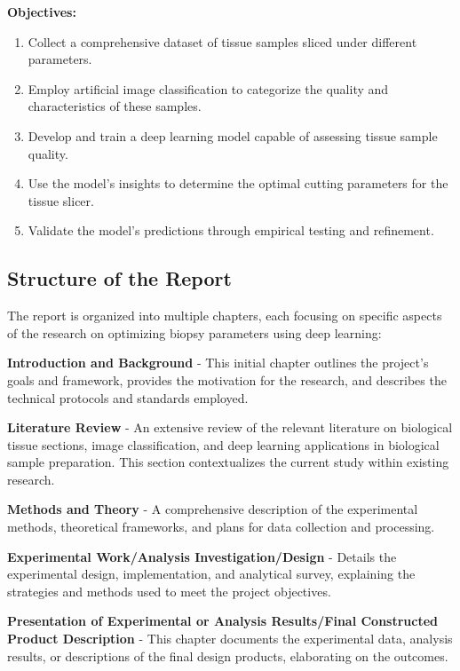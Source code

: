 \textbf{Objectives:}

\begin{enumerate}
    \item Collect a comprehensive dataset of tissue samples sliced under different parameters.
    \item Employ artificial image classification to categorize the quality and characteristics of these samples.
    \item Develop and train a deep learning model capable of assessing tissue sample quality.
    \item Use the model's insights to determine the optimal cutting parameters for the tissue slicer.
    \item Validate the model's predictions through empirical testing and refinement.
\end{enumerate}


\subsection{Structure of the Report}

The report is organized into multiple chapters, each focusing on specific aspects of the research on optimizing biopsy parameters using deep learning:

\textbf{Introduction and Background} - This initial chapter outlines the project's goals and framework, provides the motivation for the research, and describes the technical protocols and standards employed.

\textbf{Literature Review} - An extensive review of the relevant literature on biological tissue sections, image classification, and deep learning applications in biological sample preparation. This section contextualizes the current study within existing research.

\textbf{Methods and Theory} - A comprehensive description of the experimental methods, theoretical frameworks, and plans for data collection and processing.

\textbf{Experimental Work/Analysis Investigation/Design} - Details the experimental design, implementation, and analytical survey, explaining the strategies and methods used to meet the project objectives.

\textbf{Presentation of Experimental or Analysis Results/Final Constructed Product Description} - This chapter documents the experimental data, analysis results, or descriptions of the final design products, elaborating on the outcomes.

